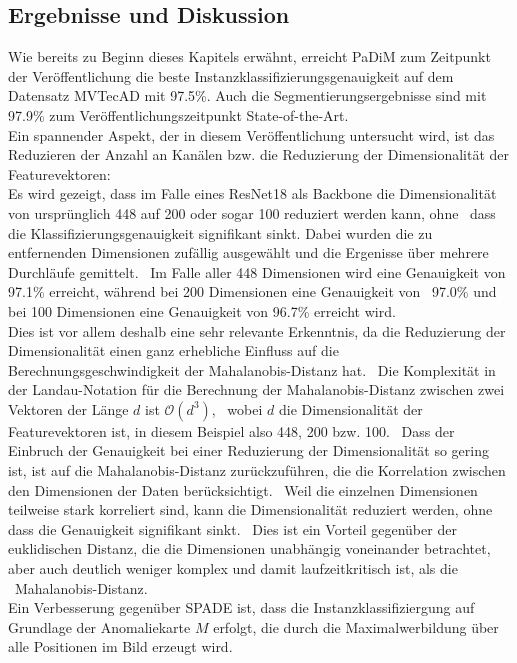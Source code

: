 \subsection{Ergebnisse und Diskussion}\label{subsec:PaDiMResults}
Wie bereits zu Beginn dieses Kapitels erwähnt, erreicht PaDiM zum Zeitpunkt der Veröffentlichung die beste Instanzklassifizierungsgenauigkeit auf dem Datensatz MVTecAD mit \num{97,5}\%. 
Auch die Segmentierungsergebnisse sind mit \num{97,9}\% zum Veröffentlichungszeitpunkt State-of-the-Art. \\
Ein spannender Aspekt, der in diesem Veröffentlichung untersucht wird, ist das Reduzieren der Anzahl an Kanälen bzw. die Reduzierung der Dimensionalität der Featurevektoren: \\
Es wird gezeigt, dass im Falle eines ResNet18 als Backbone die Dimensionalität von ursprünglich \num{448} auf \num{200} oder sogar \num{100} reduziert werden kann, ohne \
dass die Klassifizierungsgenauigkeit signifikant sinkt. Dabei wurden die zu entfernenden Dimensionen zufällig ausgewählt und die Ergenisse über mehrere Durchläufe gemittelt. \
Im Falle aller \num{448} Dimensionen wird eine Genauigkeit von \num{97,1}\% erreicht, während bei \num{200} Dimensionen eine Genauigkeit von \ 
\num{97,0}\% und bei \num{100} Dimensionen eine Genauigkeit von \num{96,7}\% erreicht wird. \\
Dies ist vor allem deshalb eine sehr relevante Erkenntnis, da die Reduzierung der Dimensionalität einen ganz erhebliche Einfluss auf die Berechnungsgeschwindigkeit der Mahalanobis-Distanz hat. \
Die Komplexität in der Landau-Notation für die Berechnung der Mahalanobis-Distanz zwischen zwei Vektoren der Länge $d$ ist $\mathcal{O}(d^{3})$\cite{bishop2006pattern}, \ 
wobei $d$ die Dimensionalität der Featurevektoren ist, in diesem Beispiel also \num{448}, \num{200} bzw. \num{100}. \
Dass der Einbruch der Genauigkeit bei einer Reduzierung der Dimensionalität so gering ist, ist auf die Mahalanobis-Distanz zurückzuführen, die die Korrelation zwischen den Dimensionen der Daten berücksichtigt. \
Weil die einzelnen Dimensionen teilweise stark korreliert sind, kann die Dimensionalität reduziert werden, ohne dass die Genauigkeit signifikant sinkt. \
Dies ist ein Vorteil gegenüber der euklidischen Distanz, die die Dimensionen unabhängig voneinander betrachtet, aber auch deutlich weniger komplex und damit laufzeitkritisch ist, als die \
Mahalanobis-Distanz. \\
Ein Verbesserung gegenüber SPADE ist, dass die Instanzklassifiziergung auf Grundlage der Anomaliekarte $M$ erfolgt, die durch die Maximalwerbildung über alle Positionen im Bild erzeugt wird. \
